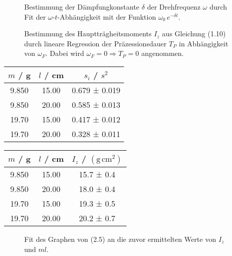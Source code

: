 \documentclass[12pt,a4paper,german]{scrartcl}
\numberwithin{equation}{section}
\begin{document}
  \begin{figure}[H]
    \centering
    
    \caption{Bestimmung der Dämpfungkonstante $\delta$ der Drehfrequenz $\omega$ durch Fit der $\omega$-$t$-Abhängigkeit mit der Funktion $\omega_0 \, e^{-\delta t}$.}
    \label{fig_damping_constant}
  \end{figure}

  \begin{figure}[H]
    \centering
    
    \caption{Bestimmung des Hauptträgheitsmoments $I_z$ aus Gleichung (1.10) durch lineare Regression der Präzessionsdauer $T_P$ in Abhängigkeit von $\omega_F$. Dabei wird $\omega_F = 0 \Rightarrow T_P = 0$ angenommen.}
    \label{fig_I_z}
  \end{figure}

  \begin{center}
    \begin{tabular}{c | c | c}
      $m$ / g & $l$ / cm & $s_i$ / $s^2$ \\
      \hline
      9.850 & 15.00 & 0.679 ± 0.019 \\
      9.850 & 20.00 & 0.585 ± 0.013 \\
      19.70 & 15.00 & 0.417 ± 0.012 \\
      19.70 & 20.00 & 0.328 ± 0.011 
    \end{tabular}
    \label{table_I_z_slopes}
  \end{center}

  \begin{center}
    \begin{tabular}{c | c | c}
      $m$ / g & $l$ / cm & $I_z$ / $(\text{g} \, \text{cm}^2)$ \\
      \hline
      9.850 & 15.00 & 15.7 ± 0.4 \\
      9.850 & 20.00 & 18.0 ± 0.4 \\
      19.70 & 15.00 & 19.3 ± 0.5 \\
      19.70 & 20.00 & 20.2 ± 0.7
    \end{tabular}
    \label{table_I_z}
  \end{center}

  \begin{figure}[H]
    \centering
    
    \caption{Fit des Graphen von (2.5) an die zuvor ermittelten Werte von $I_z$ und $m l$.}
    \label{fig_I_z_correction}
  \end{figure}
\end{document}
